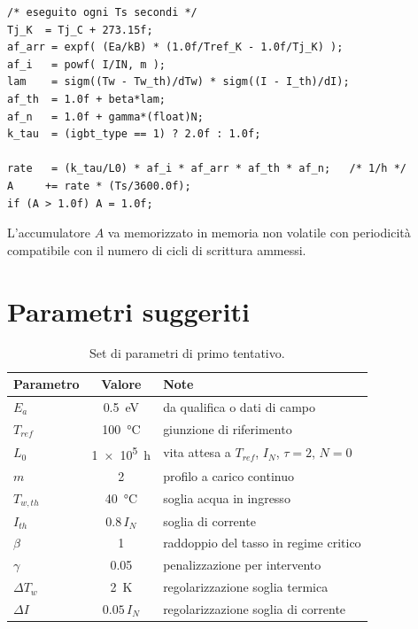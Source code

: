 \documentclass[11pt,a4paper]{article}
\begin{document}
\begin{lstlisting}[caption={Pseudo-codice per implementazione embedded.}]
/* eseguito ogni Ts secondi */
Tj_K  = Tj_C + 273.15f;
af_arr = expf( (Ea/kB) * (1.0f/Tref_K - 1.0f/Tj_K) );
af_i   = powf( I/IN, m );
lam    = sigm((Tw - Tw_th)/dTw) * sigm((I - I_th)/dI);
af_th  = 1.0f + beta*lam;
af_n   = 1.0f + gamma*(float)N;
k_tau  = (igbt_type == 1) ? 2.0f : 1.0f;

rate   = (k_tau/L0) * af_i * af_arr * af_th * af_n;   /* 1/h */
A     += rate * (Ts/3600.0f);
if (A > 1.0f) A = 1.0f;
\end{lstlisting}

L'accumulatore $A$ va memorizzato in memoria non volatile con periodicità
compatibile con il numero di cicli di scrittura ammessi.

\section{Parametri suggeriti}

\begin{table}[h]
\centering
\begin{tabular}{lcl}
\toprule
Parametro & Valore & Note \\
\midrule
$E_a$      & \SI{0.5}{\electronvolt} & da qualifica o dati di campo \\
$T_{ref}$  & \SI{100}{\degreeCelsius} & giunzione di riferimento \\
$L_0$      & \SI{1e5}{\hour}          & vita attesa a $T_{ref}$, $I_N$, $\tau=2$, $N=0$ \\
$m$        & 2                        & profilo a carico continuo \\
$T_{w,th}$ & \SI{40}{\degreeCelsius}  & soglia acqua in ingresso \\
$I_{th}$   & $0.8\,I_N$               & soglia di corrente \\
$\beta$    & 1                        & raddoppio del tasso in regime critico \\
$\gamma$   & 0.05                     & penalizzazione per intervento \\
$\Delta T_w$ & \SI{2}{\kelvin}        & regolarizzazione soglia termica \\
$\Delta I$ & $0.05\,I_N$              & regolarizzazione soglia di corrente \\
\bottomrule
\end{tabular}
\caption{Set di parametri di primo tentativo.}
\end{table}
\end{document}
